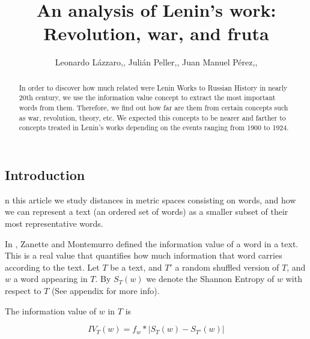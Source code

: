 \documentclass{pnastwo}
\begin{document}
\title{An analysis of Lenin's work: Revolution, war, and fruta}

\author{Leonardo Lázzaro,,
Julián Peller,,
Juan Manuel Pérez,,
}


\maketitle

\begin{article}
\begin{abstract}
In order to discover how much related were Lenin Works to Russian History in nearly 20th century, we use the information value concept to extract the most important words from them. Therefore, we find out how far are them from certain concepts such as
war, revolution, theory, etc. We expected this concepts to be nearer and farther to concepts 
treated in Lenin's works depending on the events ranging from 1900 to 1924.
\end{abstract}



\section{Introduction}

n this article we study distances in metric spaces consisting on words, and how we can
represent a text (an ordered set of words) as a smaller subset of their most representative words.

In \cite{DARWIN}, Zanette and Montemurro defined the information value of a word in a text. This is
a real value that quantifies how much information that word carries according to the text. Let $T$ be a 
text, and $T'$ a random shuffled version of $T$, and $w$ a word appearing in $T$. 
By $S_T(w)$ we denote the Shannon Entropy of $w$ with respect to $T$ (See appendix for more info). 

The information value of $w$ in $T$ is 

\begin{equation}
  IV_T(w) = f_w* | S_T(w) - S_{T'}(w) | 
\end{equation}


\end{article}
\end{document}
